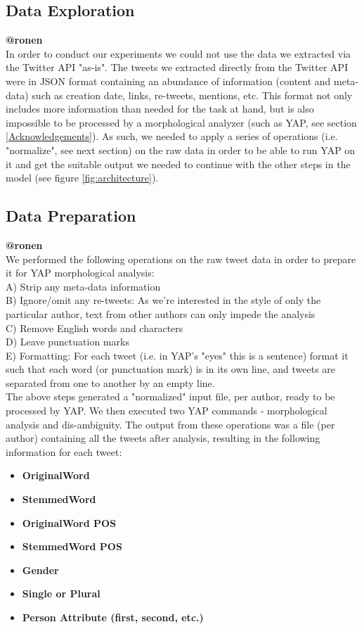 \documentclass[a4paper]{article}
\begin{document}
\subsection{Data Exploration}
\textbf{@ronen}\\
In order to conduct our experiments we could not use the data we extracted via the Twitter API "as-is". The tweets we extracted directly from the Twitter API were in JSON format containing an abundance of information (content and meta-data) such as creation date, links, re-tweets, mentions, etc. This format not only includes more information than needed for the task at hand, but is also impossible to be processed by a morphological analyzer (such as YAP, see section \ref{Acknowledgements}). As such, we needed to apply a series of operations (i.e. "normalize", see next section) on the raw data in order to be able to run YAP on it and get the suitable output we needed to continue with the other steps in the model (see figure \ref{fig:architecture}).

\subsection{Data Preparation}
\textbf{@ronen}\\
We performed the following operations on the raw tweet data in order to prepare it for YAP morphological analysis:\\
A) Strip any meta-data information\\
B) Ignore/omit any re-tweets: As we're interested in the style of only the particular author, text from other authors can only impede the analysis\\
C) Remove English words and characters\\
D) Leave punctuation marks\\
E) Formatting: For each tweet (i.e. in YAP's "eyes" this is a sentence) format it such that each word (or punctuation mark) is in its own line, and tweets are separated from one to another by an empty line.\\
The above steps generated a "normalized" input file, per author, ready to be processed by YAP. We then executed two YAP commands - morphological analysis and dis-ambiguity. The output from these operations was a file (per author) containing all the tweets after analysis, resulting in the following information for each tweet:\\
\begin{itemize}
\item \textbf{OriginalWord}
\item \textbf{StemmedWord}
\item \textbf{OriginalWord POS}
\item \textbf{StemmedWord POS}
\item \textbf{Gender}
\item \textbf{Single or Plural}
\item \textbf{Person Attribute (first, second, etc.)}
\end{itemize}
\end{document}
